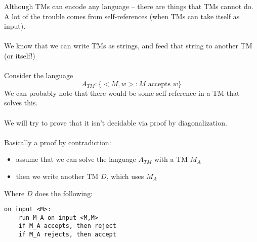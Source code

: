 \documentclass[12pt]{article}
\begin{document}
Although TMs can encode any language -- there are things that TMs cannot do. A lot of the trouble comes from self-references (when TMs can take itself as input).
\\
\\
We know that we can write TMs as strings, and feed that string to another TM (or itself!)
\\
\\
Consider the language $$A_{TM} : \{ <M,w> : M\text{ accepts }w \}$$
We can probably note that there would be some self-reference in a TM that solves this.
\\
\\
We will try to prove that it isn't decidable via proof by diagonalization.
\\
\\
Basically a proof by contradiction:
\begin{itemize}
    \item assume that we can solve the language $A_{TM}$ with a TM $M_A$
    \item then we write another TM $D$, which uses $M_A$
\end{itemize}
Where $D$ does the following:

\begin{lstlisting}
on input <M>:
    run M_A on input <M,M>
    if M_A accepts, then reject
    if M_A rejects, then accept
\end{lstlisting}
\end{document}
